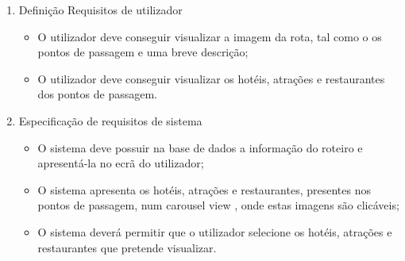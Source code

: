 \begin{enumerate}
    \item Definição Requisitos de utilizador
    \begin{itemize}
        \item O utilizador deve conseguir visualizar a imagem da rota, tal como o os pontos de passagem e uma breve descrição;
        \item O utilizador deve conseguir visualizar os hotéis, atrações e restaurantes dos pontos de passagem.
    \end{itemize}
    \item Especificação de requisitos de sistema
    \begin{itemize}
        \item O sistema deve possuir na base de dados a informação do roteiro e apresentá-la no ecrã do utilizador;
        \item O sistema apresenta os hotéis, atrações e restaurantes, presentes nos pontos de passagem, num carousel view , onde estas imagens são clicáveis;
        \item O sistema deverá permitir que o utilizador selecione os hotéis, atrações e restaurantes que pretende visualizar.
    \end{itemize}
\end{enumerate}